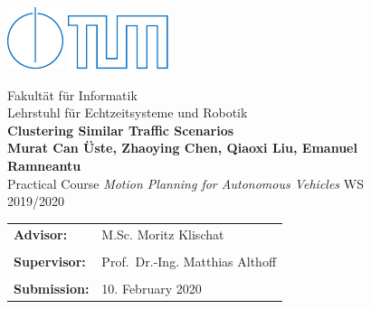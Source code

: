 \begin{figure}[!h]

  \includegraphics{./images/IN.pdf} \hfill \includegraphics{./images/tumlogo.pdf}
 
  \vspace*{1cm}
  {\large \textsf{Fakult{\"a}t f{\"u}r Informatik}}\\
  {\large \textsf{Lehrstuhl f{\"u}r Echtzeitsysteme und Robotik}}\\
   

  \vspace*{5cm}
%
%
%
%
  {\color{tumblue} \Huge \bf \textsf{Clustering Similar Traffic Scenarios}}\\  %

  \vspace*{1cm}
%
%
%
% 
  {\Large \bf \textsf{Murat Can \"Uste, Zhaoying Chen, Qiaoxi Liu, Emanuel Ramneantu}}\\   %
 
  \vspace*{8cm}
  {\Large \textsf{Practical Course \emph{Motion Planning for Autonomous Vehicles} WS 2019/2020}}\\
 
  \vspace*{1cm} 
  \begin{tabular}{ll}
%
%
%
%
    {\Large \bf \textsf{Advisor:}} &
    {\Large \textsf{M.Sc. Moritz Klischat}}\\                  %
    \\

    {\Large \bf \textsf{Supervisor:}} &
    {\Large \textsf{Prof.~Dr.-Ing. Matthias Althoff}}\\
    \\

%
%
%
%
    {\Large \bf \textsf{Submission:}} &
    {\Large \textsf{10. February 2020}}

  \end{tabular}
  
\end{figure}